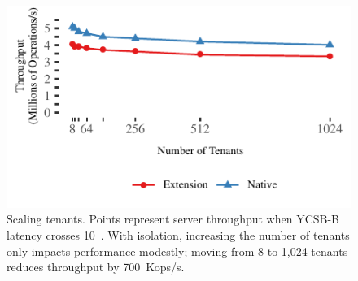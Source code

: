 \begin{figure}[t]
\centering
\includegraphics[width=1.0\columnwidth]{graphs/tenant-scalability.pdf}
\caption{Scaling tenants. Points represent server
	throughput when YCSB-B latency crosses 10~\us.
	With isolation, increasing the number of
	tenants only impacts performance modestly; moving from 8 to 1,024 tenants
	reduces throughput by 700~Kops/s.}
\label{fig:tenant-scalability}
\end{figure}

